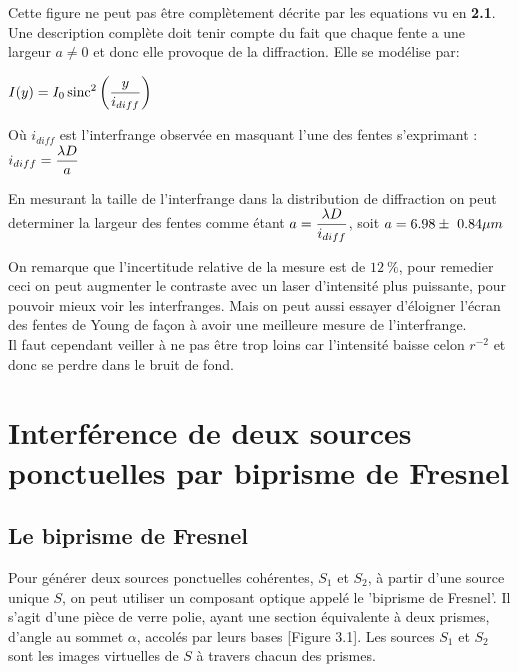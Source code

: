 \documentclass[11pt, openright]{book}
\begin{document}
				Cette figure ne peut pas être complètement décrite par les equations vu en \textbf{2.1}. Une description complète doit tenir compte du fait que chaque fente a une largeur $a\neq 0$ et donc elle provoque de la diffraction. Elle se modélise par: \\
				\centerline{$\displaystyle{I(y)=I_0\operatorname{sinc}^2\left( \frac{y}{i_{diff}} \right) }$}
				Où $i_{diff}$ est l'interfrange observée en masquant l'une des fentes s'exprimant : $\displaystyle{i_{diff}=\frac{\lambda  D}{a}}$

				En mesurant la taille de l'interfrange dans la distribution de diffraction on peut determiner la largeur des fentes comme étant $\displaystyle{a=\frac{\lambda D}{i_{diff}}}$, soit $\displaystyle{a=6.98\pm \ 0.84\mu m}$

				On remarque que l'incertitude relative de la mesure est de $12\ \%$, pour remedier ceci on peut augmenter le contraste avec un laser d'intensité plus puissante, pour pouvoir mieux voir les interfranges. Mais on peut aussi essayer d'éloigner l'écran des fentes de Young de façon à avoir une meilleure mesure de l'interfrange.\\
				Il faut cependant veiller à ne pas être trop loins car l'intensité baisse celon ${r^{-2}}$ et donc se perdre dans le bruit de fond.

		\section{Interférence de deux sources ponctuelles par biprisme de Fresnel}
				
			\subsection{Le biprisme de Fresnel}

			Pour générer deux sources ponctuelles cohérentes, $S_1$ et $S_2$, à partir d'une source unique $S$, on peut utiliser un composant optique appelé le 'biprisme de Fresnel'. Il s'agit d'une pièce de verre polie, ayant une section équivalente à deux prismes, d'angle au sommet $\alpha $, accolés par leurs bases [Figure 3.1]. Les sources $S_1$ et $S_2$ sont les images virtuelles de $S$ à travers chacun des prismes.
\end{document}
